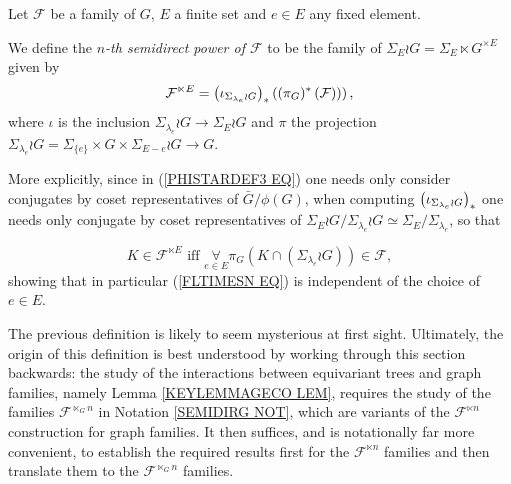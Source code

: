 \documentclass[a4paper,10pt]{article}%
\begin{document}
\begin{definition}
 Let $\mathcal{F}$ be a family of $G$,
 $E$ a finite set and $e \in E$ any fixed element.
 
We define the \textit{$n$-th semidirect power of $\mathcal{F}$} to be the family of $\Sigma_E \wr G = \Sigma_E \ltimes G^{\times E}$ given by
\begin{equation}\label{FLTIMESN EQ}
	\mathcal{F}^{\ltimes E}
		=
	\left(
	\iota_{\Sigma_{\lambda_e} \wr G}
	\right)_{\**}
	\left(
		\left(
		\pi_{G})^{\**}\left(\mathcal{F}\right)
		\right)
	\right),
\end{equation}
where $\iota$ is the inclusion 
$\Sigma_{\lambda_e} \wr G
	\to 
\Sigma_E \wr G$
and $\pi$ the projection
$\Sigma_{\lambda_e} \wr G = \Sigma_{\{e\}} \times G \times \Sigma_{E-e} \wr G
\to G$.


More explicitly, since in (\ref{PHISTARDEF3 EQ}) one needs only consider conjugates by coset representatives of $\bar{G}/\phi(G)$, when computing 
$\left( \iota_{\Sigma_{\lambda_e} \wr G}\right)_{\**}$
one needs only conjugate by coset representatives of 
$\Sigma_E \wr G/\Sigma_{\lambda_e} \wr G \simeq \Sigma_E/\Sigma_{\lambda_e}$, so that

\begin{equation}\label{FLTIMESN2 EQ}
	K \in \mathcal{F}^{\ltimes E} 
	\text{ iff }
	\underset{e \in E}{\forall} \pi_{G}
	\left(
		K \cap \left( \Sigma_{\lambda_e} \wr G \right)
	\right)
	\in \mathcal{F},
\end{equation}
showing that in particular (\ref{FLTIMESN EQ})
is independent of the choice of $e \in E$.
\end{definition}



\begin{remark}
The previous definition is likely to seem mysterious at first sight. Ultimately, the origin of this definition
is best understood by working through this section backwards:
the study of the interactions between equivariant trees and graph families, namely Lemma \ref{KEYLEMMAGECO LEM}, requires the study of the families $\mathcal{F}^{\ltimes_G n}$ in Notation \ref{SEMIDIRG NOT}, which are variants of the $\mathcal{F}^{\ltimes n}$ construction for graph families.
It then suffices, and is notationally far more convenient, to establish the required results first for the $\mathcal{F}^{\ltimes n}$ families and then translate them to the $\mathcal{F}^{\ltimes_G n}$ families.
\end{remark}
\end{document}
